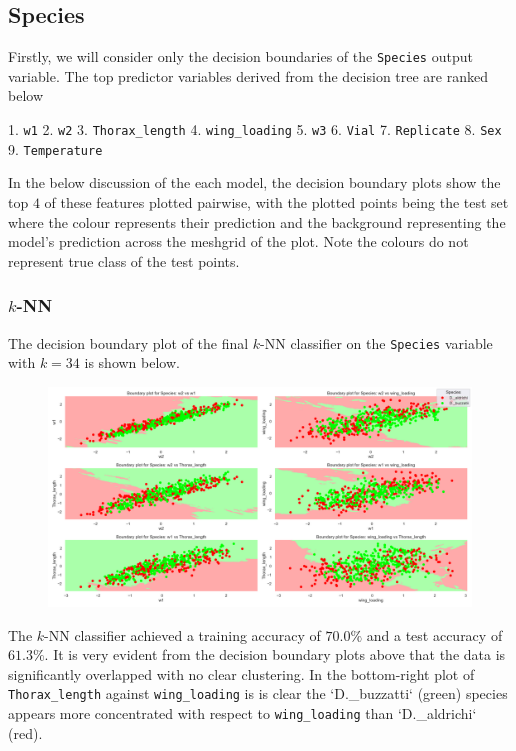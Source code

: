 \documentclass{article}
\begin{document}
\subsection{Species}

Firstly, we will consider only the decision boundaries of the \texttt{Species} output variable. The top predictor variables derived from the decision tree are ranked below


1. \texttt{w1}
2. \texttt{w2}
3. \texttt{Thorax_length}
4. \texttt{wing_loading}
5. \texttt{w3}
6. \texttt{Vial}
7. \texttt{Replicate}
8. \texttt{Sex}
9. \texttt{Temperature}


In the below discussion of the each model, the decision boundary plots show the top $4$ of these features plotted pairwise, with the plotted points being the test set where the colour represents their prediction and the background representing the model's prediction across the meshgrid of the plot. Note the colours do not represent true class of the test points.

\subsubsection{$k$-NN}

The decision boundary plot of the final $k$-NN classifier on the \texttt{Species} variable with $k = 34$ is shown below.

\begin{figure}
    \centering
    \includegraphics{plots/knn_Thorax_decision_boundaries_Species.png}
    \caption{}
    \label{fig:}
\end{figure}

The $k$-NN classifier achieved a training accuracy of $70.0\%$ and a test accuracy of $61.3\%$. It is very evident from the decision boundary plots above that the data is significantly overlapped with no clear clustering. In the bottom-right plot of \texttt{Thorax_length} against \texttt{wing_loading} is is clear the `D._buzzatti` (green) species appears more concentrated with respect to \texttt{wing_loading} than `D._aldrichi` (red). 
\end{document}
